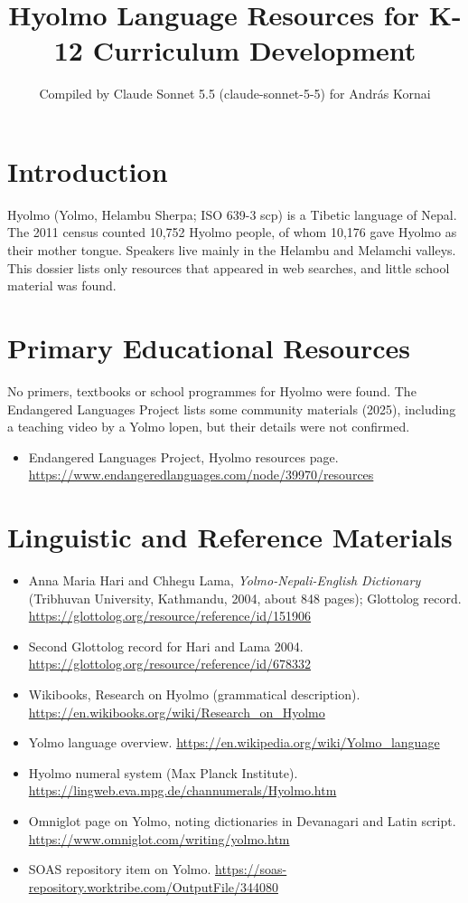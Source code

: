 \documentclass[12pt]{article}
\title{Hyolmo Language Resources for K-12 Curriculum Development}
\author{Compiled by Claude Sonnet 5.5 (claude-sonnet-5-5) for Andr\'as Kornai}
\date{}
\begin{document}
\maketitle

\section{Introduction}
Hyolmo (Yolmo, Helambu Sherpa; ISO 639-3 scp) is a Tibetic language of Nepal. The 2011 census counted 10,752 Hyolmo people, of whom 10,176 gave Hyolmo as their mother tongue. Speakers live mainly in the Helambu and Melamchi valleys. This dossier lists only resources that appeared in web searches, and little school material was found.

\section{Primary Educational Resources}
No primers, textbooks or school programmes for Hyolmo were found. The Endangered Languages Project lists some community materials (2025), including a teaching video by a Yolmo lopen, but their details were not confirmed.
\begin{itemize}
\item Endangered Languages Project, Hyolmo resources page. \url{https://www.endangeredlanguages.com/node/39970/resources}
\end{itemize}

\section{Linguistic and Reference Materials}
\begin{itemize}
\item Anna Maria Hari and Chhegu Lama, \emph{Yolmo-Nepali-English Dictionary} (Tribhuvan University, Kathmandu, 2004, about 848 pages); Glottolog record. \url{https://glottolog.org/resource/reference/id/151906}
\item Second Glottolog record for Hari and Lama 2004. \url{https://glottolog.org/resource/reference/id/678332}
\item Wikibooks, Research on Hyolmo (grammatical description). \url{https://en.wikibooks.org/wiki/Research_on_Hyolmo}
\item Yolmo language overview. \url{https://en.wikipedia.org/wiki/Yolmo_language}
\item Hyolmo numeral system (Max Planck Institute). \url{https://lingweb.eva.mpg.de/channumerals/Hyolmo.htm}
\item Omniglot page on Yolmo, noting dictionaries in Devanagari and Latin script. \url{https://www.omniglot.com/writing/yolmo.htm}
\item SOAS repository item on Yolmo. \url{https://soas-repository.worktribe.com/OutputFile/344080}
\end{itemize}
\end{document}
